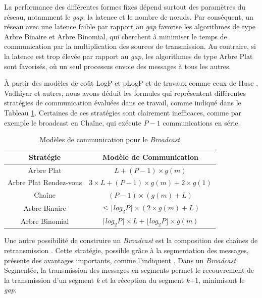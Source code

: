 La performance des différentes formes fixes dépend surtout des paramètres
du réseau, notamment le \emph{gap}, la latence et le nombre de n{\oe}uds.
Par conséquent, un réseau avec une latence faible par rapport au \emph{gap}
favorise les algorithmes de type Arbre Binaire et Arbre Binomial,
qui cherchent à minimiser le temps de communication par la multiplication
des sources de transmission. Au contraire, si la latence est trop
élevée par rapport au \emph{gap}, les algorithmes de type Arbre Plat
sont favorisés, où un seul processus envoie des messages à tous les
autres. 


À partir des modèles de coût LogP \cite{Culler96} et pLogP \cite{Kielmann01}
et de travaux comme ceux de Huse \cite{Huse99}, Vadhiyar \cite{Vadhiyar00}
et autres, nous avons déduit les formules qui représentent différentes
stratégies de communication évaluées dans ce travail, comme indiqué
dans le Tableau \ref{table:bcast_models_classique}. Certaines de
ces stratégies sont clairement inefficaces, comme par exemple le broadcast
en Chaîne, qui exécute $P-1$ communications en série. 

%
\begin{table}
	\centering
	\begin{tabular}{|c|c|}
		\hline 
		\textbf{\small Stratégie} & \textbf{\small Modèle de Communication}\tabularnewline
		\hline
		\hline 
		{\small Arbre Plat} & {\small $L+(P-1)\times g(m)$}\tabularnewline
		\hline 
		{\small Arbre Plat Rendez-vous} & {\small $3\times L+(P-1)\times g(m)+2\times g(1)$}\tabularnewline
		\hline 
		{\small Chaîne} & {\small $(P-1)\times(g(m)+L)$}\tabularnewline
		\hline 
		{\small Arbre Binaire} & {\small $\leq\lceil log_{2}P\rceil\times(2\times g(m)+L)$}\tabularnewline
		\hline 
		{\small Arbre Binomial} & {\small $\lceil log_{2}P\rceil\times L+\lfloor log_{2}P\rfloor\times g(m)$}\tabularnewline
		\hline
	\end{tabular}
	
	
	\caption{\label{table:bcast_models_classique}Modèles de communication pour
		le \emph{Broadcast}}
	
\end{table}


Une autre possibilité de construire un \emph{Broadcast} est la composition
des chaînes de retransmission \cite{Barnett96}. Cette stratégie,
possible grâce à la segmentation des messages, présente des avantages
importants, comme l'indiquent \cite{Kielmann01}\cite{Thakur03}\cite{Beaumont04a}.
Dans un \emph{Broadcast} Segmentée, la transmission des messages en
segments permet le recouvrement de la transmission d'un segment \emph{k}
et la réception du segment \emph{k}+1, minimisant le \emph{gap}.

